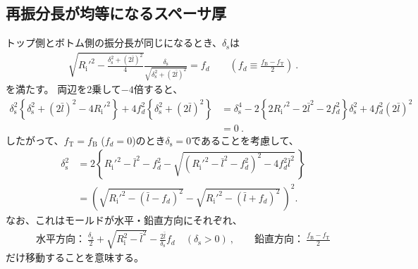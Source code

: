\clearpage
\subsection{再振分長が均等になるスペーサ厚}
トップ側とボトム側の振分長が同じになるとき、$\delta_\mathrm s$は
\begin{align*}
  \sqrt{R_\mathrm i'^2-\frac{\delta_\mathrm s^2+(2\bar l)^2}4}\frac{\delta_\mathrm s}{\sqrt{\delta_\mathrm s^2+(2\bar l)^2}} = f_d \qquad
  \left(f_d \equiv \frac{f_\mathrm B-f_\mathrm T}2\right)\ .
\end{align*}
を満たす。
両辺を2乗して$-4$倍すると、
\begin{align*}
  \delta_\mathrm s^2\left\{\delta_\mathrm s^2+(2\bar l)^2-4R_\mathrm i'^2\right\}+4f_d^2\left\{\delta_\mathrm s^2+(2\bar l)^2\right\}
  & = \delta_\mathrm s^4-2\left\{2R_\mathrm i'^2-2\bar l^2-2f_d^2\right\}\delta_\mathrm s^2+4f_d^2(2\bar l)^2\\
  & = 0\ .
\end{align*}
したがって、$f_\mathrm T = f_\mathrm B$ ($f_d = 0$)のとき$\delta_\mathrm s = 0$であることを考慮して、
\begin{align*}
  \delta_\mathrm s^2
  &= 2\left\{
       R_\mathrm i'^2-\bar l^2-f_d^2-\sqrt{\left(R_\mathrm i'^2-\bar l^2-f_d^2\right)^2-4f_d^2\bar l^2}\,
     \right\}\\
  &= \left(\sqrt{R_\mathrm i'^2-(\bar l-f_d)^2}-\sqrt{R_\mathrm i'^2-(\bar l+f_d)^2}\,\right)^{\!\!2}.
\end{align*}
なお、これはモールドが水平・鉛直方向にそれぞれ、
\begin{align*}
  \text{水平方向：}~\frac{\delta_\mathrm s}2+\sqrt{R_\mathrm i^2-\bar l^2}-\frac{2\bar l}{\delta_\mathrm s}f_d\quad(\delta_\mathrm s>0)\ , \qquad
  \text{鉛直方向：}~\frac{f_\mathrm B-f_\mathrm T}2
\end{align*}
だけ移動することを意味する。


